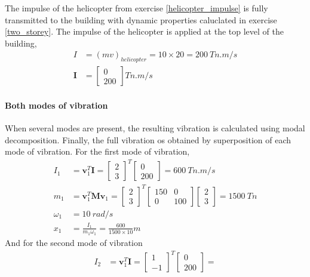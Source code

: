 \begin{Answer}[ref={two_storey_helicopter}]
The impulse of the helicopter from exercise \ref{helicopter_impulse} is fully transmitted to the building with dynamic properties caluclated in exercise \ref{two_storey}. The impulse of the helicopter is applied at the top level of the building,
\begin{align*}
I &= (mv)_{helicopter} = 10 \times 20 = \SI{200}{Tn.m/s} \\
\mathbf{I} &= \begin{bmatrix}0 \\ 200\end{bmatrix} \si{Tn.m/s}
\end{align*}

\paragraph{Both modes of vibration}
When several modes are present, the resulting vibration is calculated using modal decomposition. Finally, the full vibration os obtained by superposition of each mode of vibration. For the first mode of vibration,
\begin{align*}
    I_1 &= \mathbf{v}_1^T\mathbf{I} =
    \begin{bmatrix}2 \\ 3\end{bmatrix}^T \begin{bmatrix}0 \\ 200\end{bmatrix} =
    \SI{600}{Tn.m/s} \\
    m_1 &= \mathbf{v}_1^T\mathbf{M}\mathbf{v}_1 =
    \begin{bmatrix}2 \\ 3\end{bmatrix}^T \begin{bmatrix}150 & 0 \\ 0 & 100\end{bmatrix} \begin{bmatrix}2 \\ 3\end{bmatrix} =
    \SI{1500}{Tn} \\
    \omega_1 &= \SI{10}{rad/s} \\
    x_1 &= \frac{I_1}{m_1\omega_1} = \frac{600}{1500\times10} \si{m}
\end{align*}
And for the second mode of vibration
\begin{align*}
    I_2 &= \mathbf{v}_1^T\mathbf{I} =
    \begin{bmatrix}1 \\ -1\end{bmatrix}^T \begin{bmatrix}0 \\ 200\end{bmatrix} =

\end{align*}
\end{Answer}
